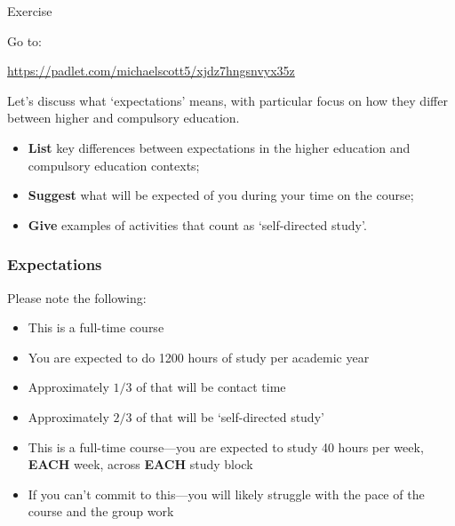 \begin{frame}{Exercise}

    Go to:
    
    \vspace{0.5em}
    
    \small{\url{https://padlet.com/michaelscott5/xjdz7hngsnvyx35z}}
    
    \vspace{1em}
    
    Let's discuss what `expectations' means, with particular focus on how they differ between higher and compulsory education.
    
    \vspace{0.5em}

	\begin{itemize}
	    \item \textbf{List} key differences between expectations in the higher education and compulsory education contexts;
		\item \textbf{Suggest} what will be expected of you during your time on the course;
		\item 	\textbf{Give} examples of activities that count as `self-directed study'.
	\end{itemize}

\end{frame}

\begin{frame}
	\frametitle{Expectations}
	
	Please note the following:
	
	\vspace{0.5em}
	
	\begin{itemize}
		\item This is a full-time course
		\item You are expected to do 1200 hours of study per academic year
		\item Approximately $1/3$ of that will be contact time
		\item Approximately $2/3$ of that will be `self-directed study'
		\item This is a full-time course---you are expected to study 40 hours per week, \textbf{EACH} week, across \textbf{EACH} study block
		\item If you can't commit to this---you will likely struggle with the pace of the course and the group work
	\end{itemize}

\end{frame}

